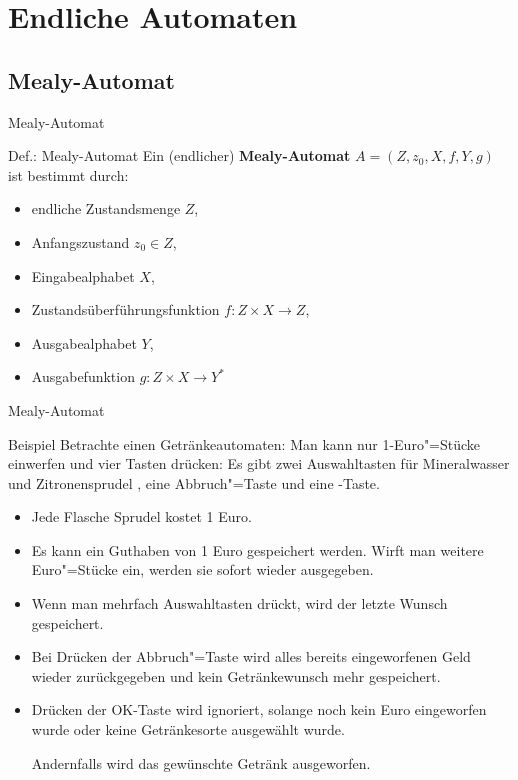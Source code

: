 \section{Endliche Automaten}
\subsection{Mealy-Automat}
\begin{frame}{Mealy-Automat}
	\begin{block}{Def.: Mealy-Automat}
		Ein (endlicher) \textbf{Mealy-Automat} $A=(Z, z_0, X, f, Y, g)$ ist bestimmt durch:
		\begin{itemize}
			\item endliche Zustandsmenge $Z$,
			\item Anfangszustand $z_0 \in Z$,
			\item Eingabealphabet $X$,
			\item Zustandsüberführungsfunktion $f: Z \times X \rightarrow Z$,
			\item Ausgabealphabet $Y$,
			\item Ausgabefunktion $g: Z \times X \rightarrow Y^{\ast}$
		\end{itemize}
	\end{block}

\end{frame}




\begin{frame}{Mealy-Automat}

	\begin{exampleblock}{Beispiel} \small
		Betrachte einen Getränkeautomaten:
		Man kann nur 1-Euro"=Stücke einwerfen und vier Tasten drücken: Es gibt
		zwei Auswahltasten für Mineralwasser \tasteRein{} und Zitronensprudel
		\tasteZitro{}, eine Abbruch"=Taste \tasteC{} und eine \tasteOK-Taste.

	
	\begin{itemize}
	\item Jede Flasche Sprudel kostet 1 Euro.
	\item Es kann ein Guthaben von 1 Euro gespeichert werden. Wirft man
	  weitere Euro"=Stücke ein, werden sie sofort wieder ausgegeben.
	\item Wenn man mehrfach Auswahltasten drückt, wird der letzte Wunsch
	  gespeichert.
	\item Bei Drücken der Abbruch"=Taste wird alles bereits eingeworfenen
	  Geld wieder zurückgegeben und kein Getränkewunsch mehr gespeichert.
	\item Drücken der OK-Taste wird ignoriert, solange noch kein Euro
	  eingeworfen wurde oder keine Getränkesorte ausgewählt wurde.

	  Andernfalls wird das gewünschte Getränk ausgeworfen.
	\end{itemize} 
	\end{exampleblock}
\end{frame}

